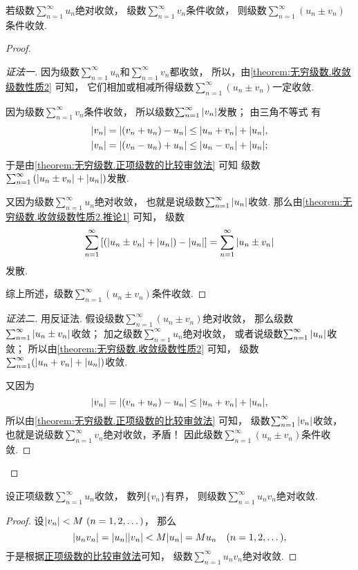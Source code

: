 \begin{proposition}\label{theorem:绝对收敛.命题1}
若级数\(\sum_{n=1}^\infty u_n\)绝对收敛，
级数\(\sum_{n=1}^\infty v_n\)条件收敛，
则级数\(\sum_{n=1}^\infty (u_n \pm v_n)\)条件收敛.
\begin{proof}\let\qed\relax
\begin{proof}[证法一]
因为级数\(\sum_{n=1}^\infty u_n\)和\(\sum_{n=1}^\infty v_n\)都收敛，
所以，由\cref{theorem:无穷级数.收敛级数性质2} 可知，
它们相加或相减所得级数\(\sum_{n=1}^\infty (u_n \pm v_n)\)一定收敛.

因为级数\(\sum_{n=1}^\infty v_n\)条件收敛，
所以级数\(\sum_{n=1}^\infty \abs{v_n}\)发散；
由三角不等式  有\begin{align*}
	\abs{v_n}
	= \abs{(v_n + u_n) - u_n}
	\leq \abs{u_n + v_n} + \abs{u_n}, \\
	\abs{v_n}
	= \abs{(v_n - u_n) + u_n}
	\leq \abs{u_n - v_n} + \abs{u_n};
\end{align*}
于是由\cref{theorem:无穷级数.正项级数的比较审敛法} 可知
级数\(\sum_{n=1}^\infty \left( \abs{u_n \pm v_n} + \abs{u_n} \right)\)发散.

又因为级数\(\sum_{n=1}^\infty u_n\)绝对收敛，
也就是说级数\(\sum_{n=1}^\infty \abs{u_n}\)收敛.
那么由\cref{theorem:无穷级数.收敛级数性质2.推论1} 可知，
级数\[
	\sum_{n=1}^\infty \left[
		\left( \abs{u_n \pm v_n} + \abs{u_n} \right) - \abs{u_n}
	\right]
	= \sum_{n=1}^\infty \abs{u_n \pm v_n}
\]发散.

综上所述，级数\(\sum_{n=1}^\infty (u_n \pm v_n)\)条件收敛.
\end{proof}
\begin{proof}[证法二]
用反证法.
假设级数\(\sum_{n=1}^\infty (u_n \pm v_n)\)绝对收敛，
那么级数\(\sum_{n=1}^\infty \abs{u_n \pm v_n}\)收敛；
加之级数\(\sum_{n=1}^\infty u_n\)绝对收敛，
或者说级数\(\sum_{n=1}^\infty \abs{u_n}\)收敛；
所以由\cref{theorem:无穷级数.收敛级数性质2} 可知，
级数\(\sum_{n=1}^\infty (\abs{u_n + v_n} + \abs{u_n})\)收敛.

又因为\[
	\abs{v_n}
	= \abs{(v_n + u_n) - u_n}
	\leq \abs{u_n + v_n} + \abs{u_n},
\]
所以由\cref{theorem:无穷级数.正项级数的比较审敛法} 可知，
级数\(\sum_{n=1}^\infty \abs{v_n}\)收敛，
也就是说级数\(\sum_{n=1}^\infty v_n\)绝对收敛，矛盾！
因此级数\(\sum_{n=1}^\infty (u_n \pm v_n)\)条件收敛.
\end{proof}
\end{proof}
\end{proposition}

\begin{proposition}\label{theorem:绝对收敛.命题2}
设正项级数\(\sum_{n=1}^\infty u_n\)收敛，
数列\(\{v_n\}\)有界，
则级数\(\sum_{n=1}^\infty u_n v_n\)绝对收敛.
\begin{proof}
设\(\abs{v_n} < M\ (n=1,2,\dotsc)\)，
那么\[
	\abs{u_n v_n}
	= \abs{u_n} \abs{v_n}
	< M \abs{u_n}
	= M u_n
	\quad(n=1,2,\dotsc),
\]
于是根据\hyperref[theorem:无穷级数.正项级数的比较审敛法的推论]{正项级数的比较审敛法}可知，
级数\(\sum_{n=1}^\infty u_n v_n\)绝对收敛.
\end{proof}
\end{proposition}

